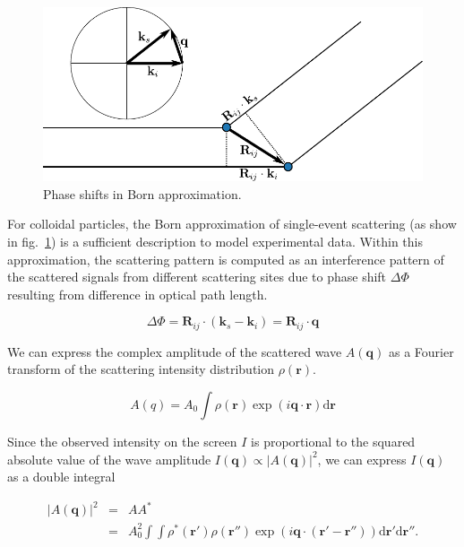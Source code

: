\documentclass{doctoral}
\newcommand{\dd}{\mathrm{d}}
\begin{document}
\begin{figure}[h]
    \centering
    \includegraphics[width=0.6\linewidth]{figures/scattering_diagram.pdf}
    \caption{Phase shifts in Born approximation.}
    \label{fig:saxs_diagram}
\end{figure}

For colloidal particles, the Born approximation of single-event scattering (as show in fig.~\ref{fig:saxs_diagram}) is a sufficient description to model experimental data.
Within this approximation, the scattering pattern is computed as an interference pattern of the scattered signals from different scattering sites due to phase shift $\Delta \Phi$ resulting from difference in optical path length.

\begin{equation}
    \Delta \Phi = \bm{R}_{ij} \cdot (\bm{k}_s - \bm{k}_i) = \bm{R}_{ij} \cdot \bm{q}
    \label{eqn:scattering-phase-shift}
\end{equation}

We can express the complex amplitude of the scattered wave $A(\bm{q})$ as a Fourier transform of the scattering intensity distribution $\rho(\bm{r})$.

\begin{equation}
    A(q) = A_0 \int \rho(\bm{r}) \exp(i \bm{q} \cdot \bm{r}) \dd \bm{r} \label{eqn:scattering-amplitude-integral}
\end{equation}

Since the observed intensity on the screen $I$ is proportional to the squared absolute value of the wave amplitude $I(\bm{q}) \propto |A(\bm{q})|^2$, we can express $I(\bm{q})$ as a double integral 

\begin{eqnarray}
    |A(\bm{q})|^2 & = & A A^{*}                                                                                                            \\
                  & = & A_0^2 \int \int \rho^{*}(\bm{r}') \rho(\bm{r}'') \exp(i \bm{q} \cdot (\bm{r}'-\bm{r}'')) \dd \bm{r}' \dd \bm{r}''.
    \label{eqn:intensity-profile-integral}
\end{eqnarray}
\end{document}

